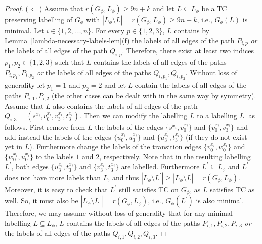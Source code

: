 \documentclass[a4paper,UKenglish]{article}
\begin{document}
\begin{proof}
($\Leftarrow $) Assume that $r(G_\phi,L_\phi )\geq 9n+k$ and let $L \subseteq L _{\phi }$ be a TC preserving labelling of $G_{\phi }$ with $|L _{\phi }\setminus L |= r(G_\phi, L_\phi) \geq 9n+k$, i.e., $G_\phi (L)$ is minimal. Let ${i\in \{1,2,\ldots ,n\}}
$. For every $p\in \{1,2,3\}$, $L $ contains by Lemma~\ref {lambda-necessary-labels-lem}(f) the labels of all edges of the path $P_{i,p}
$ \emph{or} the labels of all edges of the path $Q_{i,p}$. Therefore, there
exist at least two indices $p_{1},p_{2}\in \{1,2,3\}$ such that $L $
contains the labels of all edges of the paths $P_{i,p_{1}},P_{i,p_{2}}$ 
\emph{or} the labels of all edges of the paths $Q_{i,p_{1}},Q_{i,p_{2}}$.
Without loss of generality let $p_{1}=1$ and $p_{2}=2$ and let $L $
contain the labels of all edges of the paths $P_{i,1},P_{i,2}$ (the other
cases can be dealt with in the same way by symmetry). Assume that $L $ also
contains the labels of all edges of the path $Q_{i,3}=(s^{x_{i}},v_{0}^{x_{i}},v_{3}^{x_{i}},t_{3}^{x_{i}})$. Then we can
modify the labelling $L $ to a labelling $L ^{\prime }$ as
follows. First remove from $L $ the labels of the edges $\{  s^{x_{i}}  ,  v_{0}^{x_{i}}  \}  $ and $  \{  v_{0}^{x_{i}}  ,  v_{3}^{x_{i}}  \}  $ and add instead the
labels of the edges $  \{  u_{0}^{x_{i}}  ,  u_{3}^{x_{i}}  \}  $ and $\{  u_{3}^{x_{i}}  ,  t_{3}^{x_{i}}  \}  $ (if they do not exist yet in $L $).
Furthermore change the labels of the transition edges $\{  v_{0}^{x_{i}}  ,  w_{0}^{x_{i}}  \}  $ and $  \{  w_{0}^{x_{i}}  ,  u_{0}^{x_{i}}  \}  $ to the labels $1
$ and $2$, respectively. Note that in the resulting labelling $L
^{\prime }$, both edges $  \{  u_{3}^{x_{i}}  ,  t_{3}^{x_{i}}  \}  $ and $\{  v_{3}^{x_{i}}  ,  t_{3}^{x_{i}}  \}  $ are labelled. Furthermore $L ^{\prime
}\subseteq L _{\phi }$ and $L ^{\prime }$ does not have more
labels than $L $, and thus $|L _{\phi }\setminus L
^{\prime }|\geq |L _{\phi }\setminus L |=r(G_\phi,L_\phi )$.
Moreover, it is easy to check that $L ^{\prime }$ still satisfies TC on $G_{\phi }$, as $L $ satisfies TC as
well. So, it must also be $|L_\phi \setminus L ^{\prime }| = r(G_\phi, L_\phi)$, i.e., $G_\phi(L ^{\prime })$ is also minimal. Therefore, we may assume without loss of generality that for any
minimal labelling $L \subseteq L _{\phi }$, $L $ contains
the labels of all edges of the paths $P_{i,1},P_{i,2},P_{i,3}$ \emph{or} the
labels of all edges of the paths $Q_{i,1},Q_{i,2},Q_{i,3}$. 


\end{proof}
\end{document}
